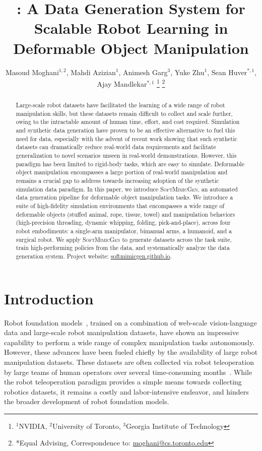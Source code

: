 \documentclass[letterpaper, 10 pt, conference]{ieeeconf}  %
\title{\LARGE \bf
\sysName: A Data Generation System for Scalable Robot Learning in Deformable Object Manipulation
}
\author{
Masoud Moghani$^{1,2}$,
Mahdi Azizian$^{1}$,
Animesh Garg$^{3}$,
Yuke Zhu$^{1}$,
Sean Huver$^{*,1}$,
Ajay Mandlekar$^{*,1}$%
\thanks{$^{1}$NVIDIA, $^{2}$University of Toronto, $^{3}$Georgia Institute of Technology}%
\thanks{*Equal Advising, Correspondence to: \href{mailto:moghani@cs.toronto.edu}{moghani@cs.toronto.edu}}%
}
\newcommand{\sysName}{\textsc{SoftMimicGen}\xspace}
\begin{document}
\maketitle
\thispagestyle{empty}
\pagestyle{empty}


\begin{abstract}


Large-scale robot datasets have facilitated the learning of a wide range of robot manipulation skills, but these datasets remain difficult to collect and scale further, owing to the intractable amount of human time, effort, and cost required. Simulation and synthetic data generation have proven to be an effective alternative to fuel this need for data, especially with the advent of recent work showing that such synthetic datasets can dramatically reduce real-world data requirements and facilitate generalization to novel scenarios unseen in real-world demonstrations. However, this paradigm has been limited to rigid-body tasks, which are easy to simulate. Deformable object manipulation encompasses a large portion of real-world manipulation and remains a crucial gap to address towards increasing adoption of the synthetic simulation data paradigm. In this paper, we introduce \sysName, an automated data generation pipeline for deformable object manipulation tasks. We introduce a suite of high-fidelity simulation environments that encompasses a wide range of deformable objects (stuffed animal, rope, tissue, towel) and manipulation behaviors (high-precision threading, dynamic whipping, folding, pick-and-place), across four robot embodiments: a single-arm manipulator, bimanual arms, a humanoid, and a surgical robot. We apply \sysName to generate datasets across the task suite, train high-performing policies from the data, and systematically analyze the data generation system. Project website: \href{https://softmimicgen.github.io}{softmimicgen.github.io}.


\end{abstract}


\section{Introduction}


Robot foundation models~\cite{brohan2023rt, kim2024openvla, black2024pi_0, bjorck2025gr00t}, trained on a combination of web-scale vision-language data and large-scale robot manipulation datasets, have shown an impressive capability to perform a wide range of complex manipulation tasks autonomously. However, these advances have been fueled chiefly by the availability of large robot manipulation datasets. These datasets are often collected via robot teleoperation by large teams of human operators over several time-consuming months~\cite{ebert2021bridge, brohan2022rt, o2024open, khazatsky2024droid}. While the robot teleoperation paradigm provides a simple means towards collecting robotics datasets, it remains a costly and labor-intensive endeavor, and hinders the broader development of robot foundation models.
\end{document}
